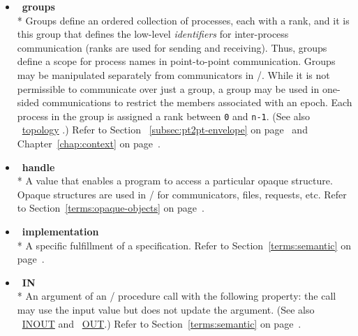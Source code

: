 \begin{itemize}
\label{glossary:groups}
\item  ~\hypertarget{glossary:groups}{\textbf{groups}} \\*
Groups define an ordered collection of processes, each with a rank, and it is this
group that defines the low-level \emph{identifiers} for inter-process communication (ranks
are used for sending and receiving).  Thus, groups define a scope for process
names in point-to-point communication.  
Groups may be manipulated separately from
communicators in \MPI/. While it is not permissible to communicate over just a group,
a group may be used in one-sided communications to restrict the members associated with an epoch. 
Each process in
the group is assigned a rank between {\tt 0} and {\tt n-1}.
(See also ~\hyperlink{glossary:topology}{topology} .)
Refer to Section ~\ref{subsec:pt2pt-envelope} on page~\pageref{subsec:pt2pt-envelope}
and Chapter~\ref{chap:context} on page~\pageref{chap:context}.

\label{glossary:handle}
\item  ~\hypertarget{glossary:handle}{\textbf{handle}} \\*
A value that enables a program to access a particular opaque structure.
Opaque structures are used in \MPI/ for communicators, files, requests, etc.
Refer to Section~\ref{terms:opaque-objects} on page~\pageref{terms:opaque-objects}.

\label{glossary:implementation}
\item  ~\hypertarget{glossary:implementation}{\textbf{implementation}} \\*
A specific fulfillment of a specification.  
Refer to Section~\ref{terms:semantic} on page~\pageref{terms:semantic}.

\label{glossary:IN}
\item  ~\hypertarget{glossary:IN}{\textbf{IN}} \\*
An argument of an \MPI/ procedure call with the following property: the call may use the input value but does 
not update the argument. 
(See also ~\hyperlink{glossary:INOUT}{INOUT} and ~\hyperlink{glossary:OUT}{OUT}.)
Refer to Section~\ref{terms:semantic} on page~\pageref{terms:semantic}.


\end{itemize}
